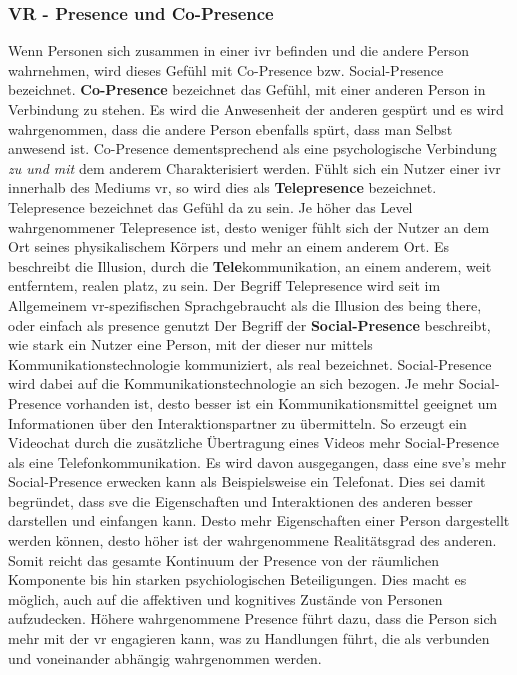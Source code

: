 \documentclass[a4paper,11pt]{article}%
\renewcommand{\\}{\vspace*{0.5\baselineskip} \newline}
\begin{document}
		\subsubsection{VR - Presence und Co-Presence}
Wenn Personen sich zusammen in einer \ac{ivr} befinden und die andere Person wahrnehmen, wird dieses Gefühl mit  \dq Co-Presence bzw. Social-Presence\dq{} bezeichnet. \citep{schuemie2001research}\\
\textbf{\dq Co-Presence\dq{}} bezeichnet das Gefühl, mit einer anderen Person in Verbindung zu stehen.
Es wird die Anwesenheit der anderen gespürt und es wird wahrgenommen, dass die andere Person ebenfalls spürt, dass man Selbst anwesend ist. 
Co-Presence dementsprechend als eine psychologische Verbindung \textit{zu und mit} dem anderem Charakterisiert werden.  \\
Fühlt sich ein Nutzer einer \ac{ivr} \dq{}innerhalb\dq{} des Mediums \ac{vr}, so wird dies als \textbf{Telepresence} bezeichnet. Telepresence bezeichnet das Gefühl \dq{}da zu sein\dq{}. Je höher das Level wahrgenommener Telepresence ist, desto weniger fühlt sich der Nutzer an dem Ort seines physikalischem Körpers und mehr an einem anderem Ort. \citep[p.482]{nowak2004effect} Es beschreibt die Illusion, durch die \textbf{Tele}kommunikation, an einem anderem, weit entferntem, realen platz, zu sein. Der Begriff Telepresence wird seit \cite[p.12]{biocca1999cyborg} im Allgemeinem \ac{vr}-spezifischen Sprachgebraucht als die Illusion des \dq{}being there\dq{}, oder einfach als \dq{}presence\dq{} genutzt\\
Der Begriff der \dq{}\textbf{Social-Presence} \dq{} beschreibt, wie stark ein Nutzer eine Person, mit der dieser nur mittels Kommunikationstechnologie kommuniziert, als \dq{}real\dq{} bezeichnet. Social-Presence wird dabei auf die Kommunikationstechnologie an sich bezogen. Je mehr Social-Presence vorhanden ist, desto besser ist ein Kommunikationsmittel geeignet um Informationen über den Interaktionspartner zu übermitteln. So erzeugt ein Videochat durch die zusätzliche Übertragung eines Videos mehr Social-Presence als eine Telefonkommunikation.  \citep[p.151]{gunawardena1995social}
Es wird davon ausgegangen, dass eine \ac{sve}'s mehr Social-Presence erwecken kann als Beispielsweise ein Telefonat. Dies sei damit begründet, dass \ac{sve} die Eigenschaften und Interaktionen des anderen besser darstellen und einfangen kann. Desto mehr Eigenschaften einer Person dargestellt werden können, desto höher ist der wahrgenommene Realitätsgrad des anderen. \citep[p. 5-8]{biocca2002defining}
Somit reicht das gesamte Kontinuum der Presence von der räumlichen Komponente bis hin starken psychiologischen Beteiligungen. Dies macht es möglich, auch auf die affektiven und kognitives Zustände von Personen aufzudecken. Höhere wahrgenommene Presence führt dazu, dass die Person sich mehr mit der \ac{vr} engagieren kann, was zu Handlungen führt, die als verbunden und voneinander abhängig wahrgenommen werden. \citep{biocca2001criteria}
\end{document}
